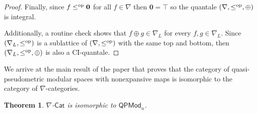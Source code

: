 \documentclass[11pt,a4paper]{amsart}
\newtheorem{theorem}{Theorem}[section]
\theoremstyle{definition}
\begin{document}
\begin{proof}
		Finally, since $f\leq^\text{\normalfont op}\mathbf{0}$ for all $f\in\nabla$ then $\mathbf{0}=\top$ so the quantale $(\nabla,\leq^\text{\normalfont op},\oplus)$ is integral.
		
		Additionally, a routine check shows that $f\oplus g\in\nabla_L$ for every $f,g\in\nabla_L.$ Since $(\nabla_L,\leq^\text{\normalfont op})$ is a sublattice of $(\nabla,\leq^\text{\normalfont op})$ with the same top and bottom, then $(\nabla_L,\leq^\text{\normalfont op},\oplus)$ is also a CI-quantale.
	\end{proof}
	
	
	
	
	
	
	
	We arrive at the main result of the paper that proves that the category of quasi-pseudometric modular spaces with nonexpansive maps is isomorphic to the category of $\nabla$-categories. 
	
	
	
	\begin{theorem}\label{thm:iso}
		$\nabla$-$\mathsf{Cat}$ is isomorphic to  $\mathsf{QPMod}_n$.
	\end{theorem}
	
\end{document}
